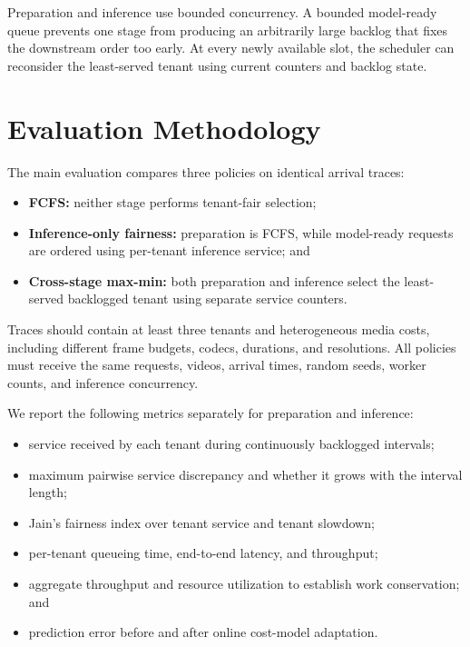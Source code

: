 \documentclass[sigplan,anonymous,review,nonacm]{acmart}
\begin{document}
Preparation and inference use bounded concurrency. A bounded model-ready queue
prevents one stage from producing an arbitrarily large backlog that fixes the
downstream order too early. At every newly available slot, the scheduler can
reconsider the least-served tenant using current counters and backlog state.

\section{Evaluation Methodology}

The main evaluation compares three policies on identical arrival traces:

\begin{itemize}
    \item \textbf{FCFS:} neither stage performs tenant-fair selection;
    \item \textbf{Inference-only fairness:} preparation is FCFS, while
    model-ready requests are ordered using per-tenant inference service; and
    \item \textbf{Cross-stage max-min:} both preparation and inference select
    the least-served backlogged tenant using separate service counters.
\end{itemize}

Traces should contain at least three tenants and heterogeneous media costs,
including different frame budgets, codecs, durations, and resolutions. All
policies must receive the same requests, videos, arrival times, random seeds,
worker counts, and inference concurrency.

We report the following metrics separately for preparation and inference:

\begin{itemize}
    \item service received by each tenant during continuously backlogged
    intervals;
    \item maximum pairwise service discrepancy and whether it grows with the
    interval length;
    \item Jain's fairness index over tenant service and tenant slowdown;
    \item per-tenant queueing time, end-to-end latency, and throughput;
    \item aggregate throughput and resource utilization to establish work
    conservation; and
    \item prediction error before and after online cost-model adaptation.
\end{itemize}
\end{document}
